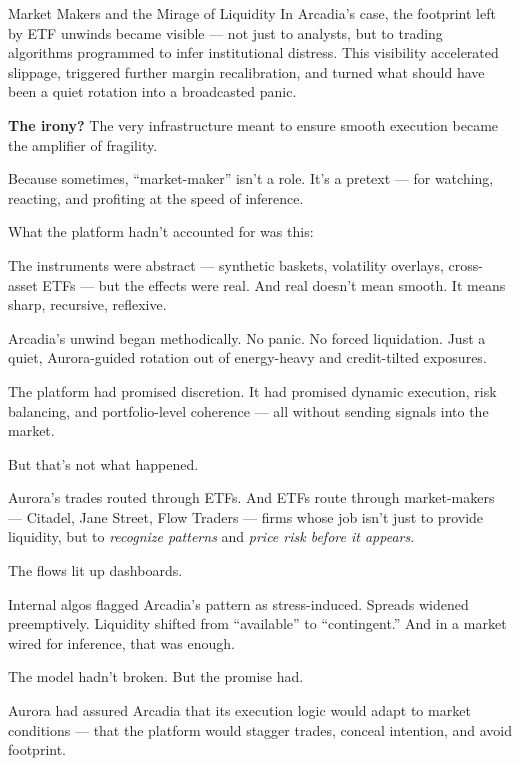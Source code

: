 \begin{TechnicalSidebar}{Market Makers and the Mirage of Liquidity}
  In Arcadia’s case, the footprint left by ETF unwinds became visible — not just to analysts,  
  but to trading algorithms programmed to infer institutional distress.  
  This visibility accelerated slippage, triggered further margin recalibration,  
  and turned what should have been a quiet rotation into a broadcasted panic.
  
  \medskip
  
  \textbf{The irony?}  
  The very infrastructure meant to ensure smooth execution became the amplifier of fragility.

  \medskip
  
  Because sometimes, “market-maker” isn’t a role.  
  It’s a pretext — for watching, reacting, and profiting at the speed of inference.
  
\end{TechnicalSidebar}


What the platform hadn’t accounted for was this:

The instruments were abstract — synthetic baskets, volatility overlays, cross-asset ETFs —  
but the effects were real.  
And real doesn’t mean smooth.  
It means sharp, recursive, reflexive.

\medskip

Arcadia’s unwind began methodically.  
No panic. No forced liquidation.  
Just a quiet, Aurora-guided rotation out of energy-heavy and credit-tilted exposures.

The platform had promised discretion.  
It had promised dynamic execution, risk balancing, and portfolio-level coherence —  
all without sending signals into the market.

But that’s not what happened.

\medskip

Aurora’s trades routed through ETFs.  
And ETFs route through market-makers — Citadel, Jane Street, Flow Traders —  
firms whose job isn’t just to provide liquidity, but to \textit{recognize patterns} and 
\textit{price risk before it appears}.

The flows lit up dashboards.

Internal algos flagged Arcadia’s pattern as stress-induced.  
Spreads widened preemptively.  
Liquidity shifted from “available” to “contingent.”  
And in a market wired for inference, that was enough.

\medskip

The model hadn’t broken.  
But the promise had.

Aurora had assured Arcadia that its execution logic would adapt to market conditions —  
that the platform would stagger trades, conceal intention, and avoid footprint.

